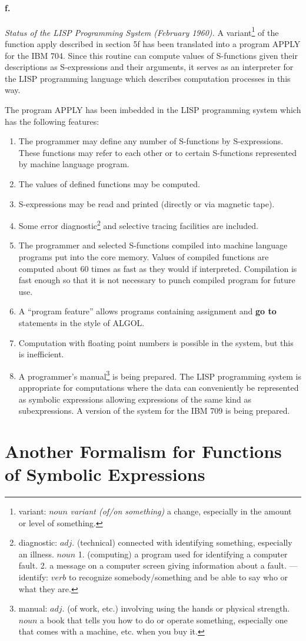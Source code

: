 \documentclass[11pt, a4paper]{article}
\begin{document}
\paragraph{f.}\textit{Status of the LISP Programming System (February 1960).}
A
variant\footnote{variant: $noun$ \textit{variant (of/on something)} a change,
  especially in the amount or level of something.}
of the function apply described in section 5f has been translated into
a program APPLY for the IBM 704. Since this routine can compute values of
S-functions given their descriptions as S-expressions and their arguments, it
serves as an interpreter for the LISP programming language which describes
computation processes in this way.

The program APPLY has been imbedded in the LISP programming system which has the
following features:
\begin{enumerate}
\item The programmer may define any number of S-functions by
  S-expressions. These functions may refer to each other or to certain
  S-functions represented by machine language program.
\item The values of defined functions may be computed.
\item S-expressions may be read and printed (directly or via magnetic tape).
\item Some error
  diagnostic\footnote{diagnostic: $adj.$ (technical) connected with identifying
    something, especially an illness. $noun$ 1. (computing) a program used for
    identifying a computer fault. 2. a message on a computer screen giving
    information about a fault. --- identify: $verb$ to recognize
    somebody/something and be able to say who or what they are.}
  and selective tracing facilities are included.
\item The programmer and selected S-functions compiled into machine language
  programs put into the core memory. Values of compiled functions are computed
  about 60 times as fast as they would if interpreted. Compilation is fast
  enough so that it is not necessary to punch compiled program for future use.
\item A ``program feature'' allows programs containing assignment and \textbf{go
  to} statements in the style of ALGOL.
\item Computation with floating point numbers is possible in the system, but
  this is inefficient.
\item A programmer's
  manual\footnote{manual: $adj.$ (of work, etc.) involving using the hands or
    physical strength. $noun$ a book that tells you how to do or operate
    something, especially one that comes with a machine, etc. when you buy it.}
  is being prepared. The LISP programming system is
  appropriate for computations where the data can conveniently be represented as
  symbolic expressions allowing expressions of the same kind as
  subexpressions. A version of the system for the IBM 709 is being prepared.
\end{enumerate}

\section{Another Formalism for Functions of Symbolic Expressions}
\end{document}
